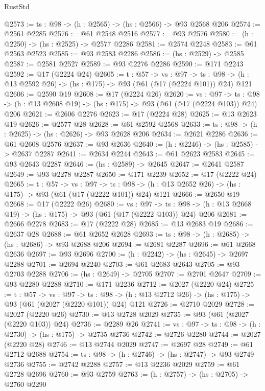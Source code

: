 \begin{lexlean}{RustStd}
\begin{coremodule}
@2573 := {ts : @98} -> (h : @2565) -> (hs : @2566) -> @93 @2568 @206
@2574 := @2561 @2285
@2576 := @61 @2548 @2516
@2577 := @93 @2576
@2580 := (h : @2250) -> (hs : @2525) -> @2577 @2286
@2581 := @2574 @2248
@2583 := @61 @2563 @2523
@2585 := @93 @2583 @2286
@2586 := (hs : @2529) -> @2585
@2587 := @2581 @2527
@2589 := @93 @2276 @2286
@2590 := @171 @2243
@2592 := @17 (@2224 @24)
@2605 := {t : @57} ->
  {vs : @97} ->
  {ts : @98} -> (h : @13 @2592 @26) -> (hs : @175) -> @93 (@61 (@17 (@2224 @101)) @24) @121
@2606 := @2590 @19
@2608 := @17 (@2224 @26)
@2620 := {vs : @97} ->
  {ts : @98} -> (h : @13 @2608 @19) -> (hs : @175) -> @93 (@61 (@17 (@2224 @103)) @24) @206
@2621 := @2606 @2276
@2623 := @17 (@2224 @28)
@2625 := @13 @2623 @19
@2626 := @2577 @28
@2628 := @61 @2592 @2568
@2633 := {ts : @98} -> (h : @2625) -> (hs : @2626) -> @93 @2628 @206
@2634 := @2621 @2286
@2636 := @61 @2608 @2576
@2637 := @93 @2636
@2640 := (h : @2246) -> (hs : @2585) -> @2637 @2287
@2641 := @2634 @2244
@2643 := @61 @2623 @2583
@2645 := @93 @2643 @2287
@2646 := (hs : @2589) -> @2645
@2647 := @2641 @2587
@2649 := @93 @2278 @2287
@2650 := @171 @2239
@2652 := @17 (@2222 @24)
@2665 := {t : @57} ->
  {vs : @97} ->
  {ts : @98} -> (h : @13 @2652 @26) -> (hs : @175) -> @93 (@61 (@17 (@2222 @101)) @24) @121
@2666 := @2650 @19
@2668 := @17 (@2222 @26)
@2680 := {vs : @97} ->
  {ts : @98} -> (h : @13 @2668 @19) -> (hs : @175) -> @93 (@61 (@17 (@2222 @103)) @24) @206
@2681 := @2666 @2278
@2683 := @17 (@2222 @28)
@2685 := @13 @2683 @19
@2686 := @2637 @28
@2688 := @61 @2652 @2628
@2693 := {ts : @98} -> (h : @2685) -> (hs : @2686) -> @93 @2688 @206
@2694 := @2681 @2287
@2696 := @61 @2668 @2636
@2697 := @93 @2696
@2700 := (h : @2242) -> (hs : @2645) -> @2697 @2288
@2701 := @2694 @2240
@2703 := @61 @2683 @2643
@2705 := @93 @2703 @2288
@2706 := (hs : @2649) -> @2705
@2707 := @2701 @2647
@2709 := @93 @2280 @2288
@2710 := @171 @2236
@2712 := @2027 (@2220 @24)
@2725 := {t : @57} ->
  {vs : @97} ->
  {ts : @98} -> (h : @13 @2712 @26) -> (hs : @175) -> @93 (@61 (@2027 (@2220 @101)) @24) @121
@2726 := @2710 @2029
@2728 := @2027 (@2220 @26)
@2730 := @13 @2728 @2029
@2735 := @93 (@61 (@2027 (@2220 @103)) @24)
@2736 := @2289 @26
@2741 := {vs : @97} -> {ts : @98} -> (h : @2730) -> (hs : @175) -> @2735 @2736
@2742 := @2726 @2280
@2744 := @2027 (@2220 @28)
@2746 := @13 @2744 @2029
@2747 := @2697 @28
@2749 := @61 @2712 @2688
@2754 := {ts : @98} -> (h : @2746) -> (hs : @2747) -> @93 @2749 @2736
@2755 := @2742 @2288
@2757 := @13 @2236 @2029
@2759 := @61 @2728 @2696
@2760 := @93 @2759
@2763 := (h : @2757) -> (hs : @2705) -> @2760 @2290

\end{coremodule}
\end{lexlean}
